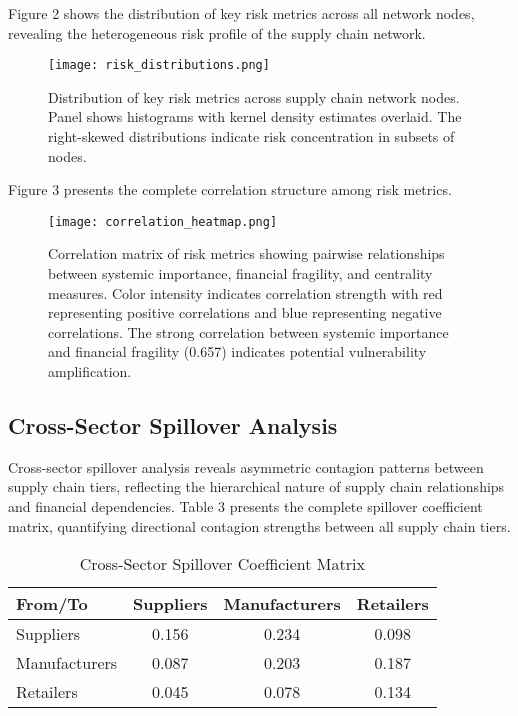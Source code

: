 \documentclass[a4 paper, 11pt,twoside]{article}
\newcommand{\0}{\Bf{0}}
\theoremstyle{definition}
\begin{document}
Figure 2 shows the distribution of key risk metrics across all network nodes, revealing the heterogeneous risk profile of the supply chain network.

\begin{figure}[H]
\centering
\texttt{[image: risk\_distributions.png]}
\caption{Distribution of key risk metrics across supply chain network nodes. Panel shows histograms with kernel density estimates overlaid. The right-skewed distributions indicate risk concentration in subsets of nodes.}
\end{figure}

Figure 3 presents the complete correlation structure among risk metrics.

\begin{figure}[H]
\centering
\texttt{[image: correlation\_heatmap.png]}
\caption{Correlation matrix of risk metrics showing pairwise relationships between systemic importance, financial fragility, and centrality measures. Color intensity indicates correlation strength with red representing positive correlations and blue representing negative correlations. The strong correlation between systemic importance and financial fragility (0.657) indicates potential vulnerability amplification.}
\end{figure}

\subsection{Cross-Sector Spillover Analysis}

Cross-sector spillover analysis reveals asymmetric contagion patterns between supply chain tiers, reflecting the hierarchical nature of supply chain relationships and financial dependencies. Table 3 presents the complete spillover coefficient matrix, quantifying directional contagion strengths between all supply chain tiers.

\begin{table}[H]
\centering
\caption{Cross-Sector Spillover Coefficient Matrix}
\begin{tabular}{@{}lccc@{}}
\toprule
\textbf{From/To} & \textbf{Suppliers} & \textbf{Manufacturers} & \textbf{Retailers} \\
\midrule
Suppliers & 0.156 & 0.234 & 0.098 \\
Manufacturers & 0.087 & 0.203 & 0.187 \\
Retailers & 0.045 & 0.078 & 0.134 \\
\bottomrule
\end{tabular}
\end{table}
\end{document}
